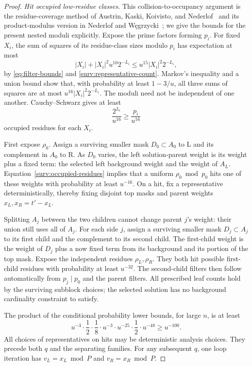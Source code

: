 \begin{proof}
\emph{Hit occupied low-residue classes.}
This collision-to-occupancy argument is the residue-coverage method of
Austrin, Kaski, Koivisto, and Nederlof~\cite[Proposition~3.5]{AKKN16}
and its product-modulus version in Nederlof and
W\k{e}grzycki~\cite[full version, Lemma~3.2]{NW21}; we give the bounds
for the present nested moduli explicitly.
Expose the prime factors forming \(p_i\). For fixed \(X_i\),
the sum of squares of its residue-class sizes modulo \(p_i\) has
expectation at most
\[
 |X_i|+|X_i|^2u^{10}2^{-L_i}
 \le u^{15}|X_i|^2 2^{-L_i},
\]
by \eqref{eq:filter-bounds} and \eqref{surv:representative-count}.
Markov's inequality and a union bound show that, with probability at
least \(1-3/u\), all three sums of squares are at most
\(u^{16}|X_i|^2 2^{-L_i}\). The moduli need not be independent of
one another. Cauchy--Schwarz gives at least
\begin{equation}\label{surv:occupied-residues}
 \frac{2^{L_i}}{u^{16}}\ge \frac{p_i}{u^{16}}
\end{equation}
occupied residues for each \(X_i\).

First expose \(\rho_0\). Assign a surviving smaller mask
\(D_0\subset A_0\) to L and its complement in \(A_0\) to R. As
\(D_0\) varies, the left solution-parent weight is its weight plus
a fixed term: the selected left background weight and the weight of
\(A_L\). Equation~\eqref{surv:occupied-residues} implies that a
uniform \(\rho_0\bmod p_0\) hits one of these weights with
probability at least \(u^{-16}\). On a hit, fix a representative
deterministically, thereby fixing disjoint top masks and parent weights
\(x_L,x_R=t'-x_L\).

Splitting \(A_j\) between the two children cannot change parent \(j\)'s
weight: their union still uses all of \(A_j\). For each side \(j\),
assign a surviving smaller mask
\(D_j\subset A_j\) to its first child and the complement to its
second child. The first-child weight is the weight of \(D_j\) plus
a now fixed term from its background and its portion of the top mask.
Expose the independent residues \(\rho_L,\rho_R\). They both hit
possible first-child residues with probability at least \(u^{-32}\).
The second-child filters then follow automatically from
\(p_j\mid p_0\) and the parent filters. All prescribed leaf counts
hold by the surviving subblock choices; the selected solution has no
background cardinality constraint to satisfy.

The product of the conditional probability lower bounds, for large
\(n\), is at least
\[
 u^{-3}\cdot\frac12\cdot\frac18\cdot u^{-3}
 \cdot u^{-25}\cdot\frac12\cdot u^{-48}
 \ge u^{-100}.
\]
All choices of representatives on hits may be deterministic analysis
choices. They precede both \(q\) and the separating families. For any
subsequent \(q\), one loop iteration has
\(v_L=x_L\bmod P\) and \(v_R=x_R\bmod P\).
\end{proof}
